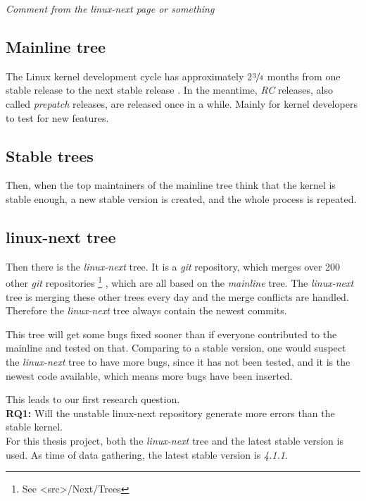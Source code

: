 \documentclass[a4paper,11pt]{report}
\begin{document}
\begin{center}
    \emph{
        Comment from the linux-next page or something
    }
\end{center}


        \subsection{Mainline tree}

The Linux kernel development cycle has approximately 2$\sfrac{3}{4}$ months 
from one stable release to the next stable release
    \cite{crystalball}
.
In the meantime, \emph{RC} 
releases, also called \emph{prepatch} releases, are released once in a while. 
Mainly for kernel developers to test for new features. 


        \subsection{Stable trees}

Then, when the top maintainers of the mainline tree think that the kernel is 
stable enough, a new stable version is created, and the whole process is 
repeated.


        \subsection{linux-next tree}

Then there is the \emph{linux-next} tree. It is a \emph{git} repository, which 
merges over 200 other \emph{git} repositories
    \footnote{See <src>/Next/Trees}
, which 
are all based on the \emph{mainline} tree. The \emph{linux-next} tree is 
merging these other trees every day and the merge conflicts are handled. 
Therefore the \emph{linux-next} tree always contain the newest commits. 

This tree will get some bugs fixed sooner than if everyone contributed to the 
mainline and tested on that. Comparing to a stable version, one would suspect 
the \emph{linux-next} tree to have more bugs, since it has not been tested, 
and it is the newest code available, which means more bugs have been inserted. 

This leads to our first research question.
\\

\textbf{RQ1:} Will the unstable linux-next repository generate more errors than 
the stable kernel.
\\

For this thesis project, both the \emph{linux-next} tree and the latest stable 
version is used. As time of data gathering, the latest stable version is 
\emph{4.1.1}.
\end{document}
